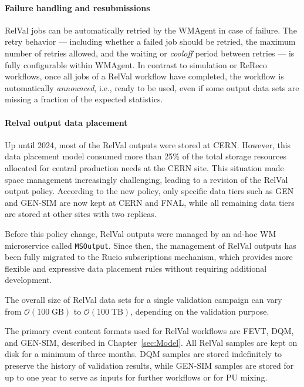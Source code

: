 \paragraph*{Failure handling and resubmissions}

\gls{RelVal} jobs can be automatically retried by the WMAgent in case of failure. The retry behavior — including whether a failed job should be retried, the maximum number of retries allowed, and the waiting or \textit{cooloff} period between retries — is fully configurable within WMAgent. In contrast to simulation or ReReco workflows, once all jobs of a \gls{RelVal} workflow have completed, the workflow is automatically \emph{announced}, i.e., ready to be used, even if some output data sets are missing a fraction of the expected statistics.

\paragraph*{Relval output data placement}
Up until 2024, most of the \gls{RelVal} outputs were stored at CERN. However, this data placement model consumed more than 25\% of the total storage resources allocated for central production needs at the CERN \TierTwo site. This situation made space management increasingly challenging, leading to a revision of the \gls{RelVal} output policy. According to the new policy, only specific data tiers such as \gls{GEN} and \gls{GEN}-\gls{SIM} are now kept at CERN and \gls{FNAL}, while all remaining data tiers are stored at other sites with two replicas.


Before this policy change, \gls{RelVal} outputs were managed by an ad-hoc \gls{WM} microservice called \texttt{MSOutput}. Since then, the management of \gls{RelVal} outputs has been fully migrated to the Rucio subscriptions mechanism, which provides more flexible and expressive data placement rules without requiring additional development.

The overall size of \gls{RelVal} data sets for a single validation campaign can vary from $\mathcal{O}(100\;\text{GB})$ to $\mathcal{O}(100\;\text{TB})$, depending on the validation purpose. 

The primary event content formats used for \gls{RelVal} workflows are \gls{FEVT}, \gls{DQM}, and \gls{GEN}-\gls{SIM}, described in Chapter~\ref{sec:Model}. All \gls{RelVal} samples are kept on disk for a minimum of three months. \gls{DQM} samples are stored indefinitely to preserve the history of validation results, while \gls{GEN}-\gls{SIM} samples are stored for up to one year to serve as inputs for further workflows or for \gls{PU} mixing.


